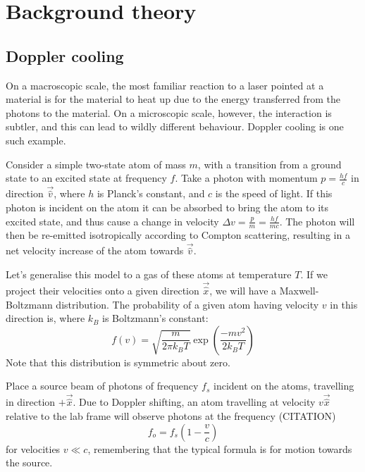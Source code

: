 \documentclass[11pt,twoside,a4paper]{article}
\begin{document}
\section{Background theory}
\subsection{Doppler cooling}
On a macroscopic scale, the most familiar reaction to a laser pointed at a material is for the material to heat up due to the energy transferred from the photons to the material. On a microscopic scale,
however, the interaction is subtler, and this can lead to wildly different behaviour. Doppler cooling is one such example.

Consider a simple two-state atom of mass \(m\), with a transition from a ground state to an excited state at frequency \(f\). Take a photon with momentum \(p=\frac{hf}{c}\) in direction \(\vec{\hat{v}}\), where \(h\) is Planck's constant, and \(c\) is the speed of light.
If this photon is incident on the atom it can be absorbed to bring the atom to
its excited state, and thus cause a change in velocity \(\Delta v=\frac{p}{m}=\frac{hf}{mc}\). The photon will then be re-emitted isotropically according to Compton scattering, resulting in a net velocity increase of the atom towards \(\vec{\hat{v}}\).

Let's generalise this model to a gas of these atoms at temperature \(T\). If we project their velocities onto a given direction \(\vec{\hat{x}}\), we will have a Maxwell-Boltzmann distribution. The probability of a given atom having velocity \(v\) in this direction is,
where \(k_B\) is Boltzmann's constant:~\cite{muller}
\begin{equation}
    f(v) = \sqrt{\frac{m}{2\pi k_B T}}\exp\left(\frac{-mv^2}{2k_B T}\right)
\end{equation}
Note that this distribution is symmetric about zero.

Place a source beam of photons of frequency \(f_s\) incident on the atoms, travelling in direction \(+\vec{\hat{x}}\).
Due to Doppler shifting, an atom travelling at velocity \(v\vec{\hat{x}}\) relative to the lab frame will observe photons at the frequency (CITATION)
\begin{equation}
    f_o = f_s\left(1-\frac{v}{c}\right)
\end{equation}
for velocities \(v\ll c\), remembering that the typical formula is for motion towards the source.
\end{document}
